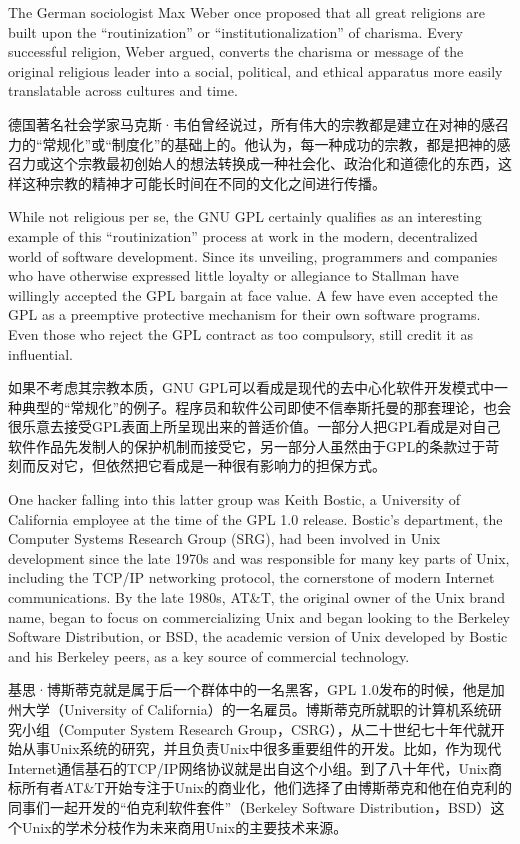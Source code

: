 \ifdefined\eng
The German sociologist Max Weber once proposed that all great religions are built upon the ``routinization'' or ``institutionalization'' of charisma. Every successful religion, Weber argued, converts the charisma or message of the original religious leader into a social, political, and ethical apparatus more easily translatable across cultures and time.
\fi

\ifdefined\chs
德国著名社会学家马克斯·韦伯曾经说过，所有伟大的宗教都是建立在对神的感召力的``常规化''或``制度化''的基础上的。他认为，每一种成功的宗教，都是把神的感召力或这个宗教最初创始人的想法转换成一种社会化、政治化和道德化的东西，这样这种宗教的精神才可能长时间在不同的文化之间进行传播。
\fi

\ifdefined\eng
While not religious per se, the GNU GPL certainly qualifies as an interesting example of this ``routinization'' process at work in the modern, decentralized world of software development. Since its unveiling, programmers and companies who have otherwise expressed little loyalty or allegiance to Stallman have willingly accepted the GPL bargain at face value. A few have even accepted the GPL as a preemptive protective mechanism for their own software programs. Even those who reject the GPL contract as too compulsory, still credit it as influential.
\fi

\ifdefined\chs
如果不考虑其宗教本质，GNU GPL可以看成是现代的去中心化软件开发模式中一种典型的``常规化''的例子。程序员和软件公司即使不信奉斯托曼的那套理论，也会很乐意去接受GPL表面上所呈现出来的普适价值。一部分人把GPL看成是对自己软件作品先发制人的保护机制而接受它，另一部分人虽然由于GPL的条款过于苛刻而反对它，但依然把它看成是一种很有影响力的担保方式。
\fi

\ifdefined\eng
One hacker falling into this latter group was Keith Bostic, a University of California employee at the time of the GPL 1.0 release. Bostic's department, the Computer Systems Research Group (SRG), had been involved in Unix development since the late 1970s and was responsible for many key parts of Unix, including the TCP/IP networking protocol, the cornerstone of modern Internet communications. By the late 1980s, AT\&T, the original owner of the Unix brand name, began to focus on commercializing Unix and began looking to the Berkeley Software Distribution, or BSD, the academic version of Unix developed by Bostic and his Berkeley peers, as a key source of commercial technology.
\fi

\ifdefined\chs
基思·博斯蒂克就是属于后一个群体中的一名黑客，GPL 1.0发布的时候，他是加州大学（University of California）的一名雇员。博斯蒂克所就职的计算机系统研究小组（Computer System Research Group，CSRG），从二十世纪七十年代就开始从事Unix系统的研究，并且负责Unix中很多重要组件的开发。比如，作为现代Internet通信基石的TCP/IP网络协议就是出自这个小组。到了八十年代，Unix商标所有者AT\&T开始专注于Unix的商业化，他们选择了由博斯蒂克和他在伯克利的同事们一起开发的``伯克利软件套件''（Berkeley Software Distribution，BSD）这个Unix的学术分枝作为未来商用Unix的主要技术来源。
\fi

